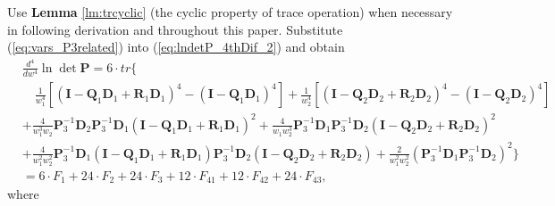 \documentclass[12pt]{article}
\begin{document}
Use \textbf{Lemma} \ref{lm:trcyclic} (the cyclic property of trace operation) when necessary in following derivation and throughout this paper. Substitute (\ref{eq:vars_P3related}) into (\ref{eq:lndetP_4thDif_2}) and obtain
\begin{align}   \label{eq:lndetP_4thDif_decompose}
&\frac{d^4}{dw^4} \ln \det \mathbf{P} = 6 \cdot tr\{  \nonumber \\
& \quad \frac{1}{w_1^4} [(\mathbf{I} - \mathbf{Q}_1 \mathbf{D}_1 + \mathbf{R}_1 \mathbf{D}_1)^4 - (\mathbf{I} - \mathbf{Q}_1 \mathbf{D}_1)^4] 
  + \frac{1}{w_2^4} [(\mathbf{I} - \mathbf{Q}_2 \mathbf{D}_2 + \mathbf{R}_2 \mathbf{D}_2)^4 - (\mathbf{I} - \mathbf{Q}_2 \mathbf{D}_2)^4]  \nonumber \\
& + \frac{4}{w_1^3 w_2} \mathbf{P}_3^{-1} \mathbf{D}_2 \mathbf{P}_3^{-1} \mathbf{D}_1 (\mathbf{I} - \mathbf{Q}_1 \mathbf{D}_1 + \mathbf{R}_1 \mathbf{D}_1)^2
  + \frac{4}{w_1 w_2^3} \mathbf{P}_3^{-1} \mathbf{D}_1 \mathbf{P}_3^{-1} \mathbf{D}_2 (\mathbf{I} - \mathbf{Q}_2 \mathbf{D}_2 + \mathbf{R}_2 \mathbf{D}_2)^2 \nonumber \\
& + \frac{4}{w_1^2 w_2^2} \mathbf{P}_3^{-1} \mathbf{D}_1 (\mathbf{I} - \mathbf{Q}_1 \mathbf{D}_1 + \mathbf{R}_1 \mathbf{D}_1) \mathbf{P}_3^{-1} \mathbf{D}_2 (\mathbf{I} - \mathbf{Q}_2 \mathbf{D}_2 + \mathbf{R}_2 \mathbf{D}_2)
  + \frac{2}{w_1^2 w_2^2} (\mathbf{P}_3^{-1} \mathbf{D}_1 \mathbf{P}_3^{-1} \mathbf{D}_2)^2
\}  \nonumber \\
& = 6 \cdot F_1 + 24 \cdot F_2 + 24 \cdot F_3 + 12 \cdot F_{41} + 12 \cdot F_{42} + 24 \cdot F_{43},
\end{align}
where
\end{document}
